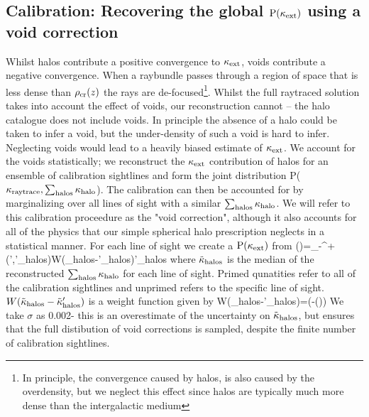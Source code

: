 \documentclass[useAMS,usenatbib]{mn2e}
\begin{document}

\subsection{Calibration: Recovering the global ${\rm P}(\kappa_{\rm ext})$ using a void correction}
\label{subsec:voids}

Whilst halos contribute a positive convergence to $\kappa_{\rm ext}$, voids contribute
a negative convergence. When a raybundle passes through a  region of space
that is less dense than $\rho_{\rm cr}(z)$ the rays are de-focused\footnote{In
principle, the convergence caused by halos, is also caused by the overdensity,
but we neglect this effect since halos are typically much more dense than the
intergalactic medium}. Whilst the  full raytraced solution takes into account
the effect of voids, our reconstruction cannot -- the halo catalogue does not
include voids. In principle the absence of a halo could be taken to infer a
void, but the under-density of such a void is hard to infer. Neglecting voids
would lead to a heavily biased estimate of $\kappa_{\rm ext}$. We account for the voids
statistically; we reconstruct
the $\kappa_{\rm ext}$ contribution of halos for an ensemble of calibration sightlines
and form the joint distribution P($\kappa_{\rm raytrace},\sum_{\rm halos} \kappa_{\rm halo}$). The calibration
can then be accounted for by marginalizing over all lines of sight with a similar
 $\sum_{\rm halos} \kappa_{\rm halo}$.  We will refer to this calibration proceedure as the "void correction",
although it also accounts for all of the physics that our simple spherical halo prescription
neglects in a statistical manner. For each line of sight we create a ${\rm P}(\kappa_{\rm ext})$ from
\be
\pr(\kappax)=\int_{-\infty}^{+\infty}\pr(\kapparay',\tilde\kappa'_{\rm halos})W(\tilde\kappa_{\rm halos}-\tilde\kappa'_{\rm halos})\dee \tilde\kappa'_{\rm halos}
\ee
where $\tilde{\kappa}_{\rm halos}$ is the median of the reconstructed $\sum_{\rm halos} \kappa_{\rm halo}$ for each line of sight.
Primed qunatities refer to all of the calibration sightlines and unprimed refers to the specific line of sight.
$W(\tilde\kappa_{\rm halos}-\tilde\kappa'_{\rm halos})$ is a weight function given by
\be
\label{eq:weighting}
W(\tilde\kappa_{\rm halos}-\tilde\kappa'_{\rm halos})=\exp\left(-\left(\right)\right)
\ee
We take $\sigma$ as 0.002- this is an overestimate of the uncertainty on $\tilde\kappa_{\rm halos}$, but ensures that the full distibution of void corrections is sampled, despite the finite number of calibration sightlines.
\end{document}
